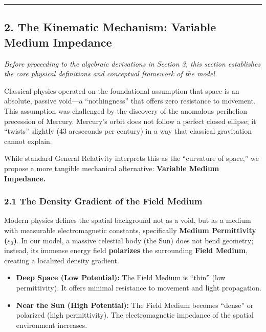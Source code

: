 \documentclass[twocolumn]{article}
\providecommand{\tightlist}{%
  \setlength{\itemsep}{0pt}\setlength{\parskip}{0pt}}
\begin{document}
\begin{center}\rule{0.5\linewidth}{0.5pt}\end{center}

\subsection{2. The Kinematic Mechanism: Variable Medium
Impedance}\label{the-kinematic-mechanism-variable-medium-impedance}

\emph{Before proceeding to the algebraic derivations in Section 3, this
section establishes the core physical definitions and conceptual
framework of the model.}

Classical physics operated on the foundational assumption that space is
an absolute, passive void---a ``nothingness'' that offers zero
resistance to movement. This assumption was challenged by the discovery
of the anomalous perihelion precession of Mercury. Mercury's orbit does
not follow a perfect closed ellipse; it ``twists'' slightly (43
arcseconds per century) in a way that classical gravitation cannot
explain.

While standard General Relativity interprets this as the ``curvature of
space,'' we propose a more tangible mechanical alternative:
\textbf{Variable Medium Impedance.}

\subsubsection{2.1 The Density Gradient of the Field
Medium}\label{the-density-gradient-of-the-field-medium}

Modern physics defines the spatial background not as a void, but as a
medium with measurable electromagnetic constants, specifically
\textbf{Medium Permittivity (\(\varepsilon_0\))}. In our model, a
massive celestial body (the Sun) does not bend geometry; instead, its
immense energy field \textbf{polarizes} the surrounding \textbf{Field
Medium}, creating a localized density gradient.

\begin{itemize}
\tightlist
\item
  \textbf{Deep Space (Low Potential):} The Field Medium is ``thin'' (low
  permittivity). It offers minimal resistance to movement and light
  propagation.
\item
  \textbf{Near the Sun (High Potential):} The Field Medium becomes
  ``dense'' or polarized (high permittivity). The electromagnetic
  impedance of the spatial environment increases.
\end{itemize}
\end{document}
